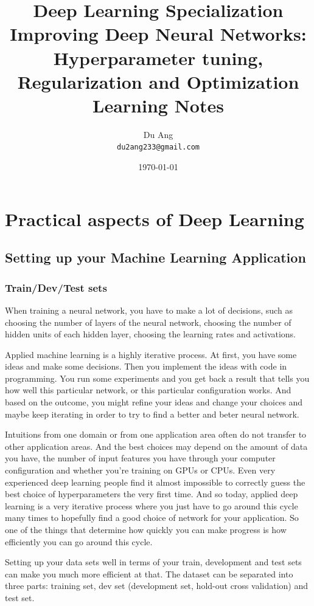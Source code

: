 \documentclass[UTF8]{article}
\title{Deep Learning Specialization \\
        Improving Deep Neural Networks: Hyperparameter tuning, Regularization and Optimization \\
        Learning Notes}
\author{Du Ang \\ \texttt{du2ang233@gmail.com} }
\date{\today}
\begin{document}
\maketitle

\tableofcontents
\newpage

\section{Practical aspects of Deep Learning}
\subsection{Setting up your Machine Learning Application}
\subsubsection{Train/Dev/Test sets}
When training a neural network, you have to make a lot of decisions, such as choosing the number of
layers of the neural network, choosing the number of hidden units of each hidden layer, choosing
the learning rates and activations.

Applied machine learning is a highly iterative process. At first, you have some ideas and make some
decisions. Then you implement the ideas with code in programming. You run some experiments and you
get back a result that tells you how well this particular network, or this particular configuration
works. And based on the outcome, you might refine your ideas and change your choices and maybe keep
iterating in order to try to find a better and beter neural network.

Intuitions from one domain or from one application area often do not transfer to other application
areas. And the best choices may depend on the amount of data you have, the number of input features
you have through your computer configuration and whether you're training on GPUs or CPUs. Even very
experienced deep learning people find it almost impossible to correctly guess the best choice of
hyperparameters the very first time. And so today, applied deep learning is a very iterative
process where you just have to go around this cycle many times to hopefully find a good choice of
network for your application. So one of the things that determine how quickly you can make progress
is how efficiently you can go around this cycle.

Setting up your data sets well in terms of your train, development and test sets can make you much
more efficient at that. The dataset can be separated into three parts: training set, dev set
(development set, hold-out cross validation) and test set.
\end{document}
